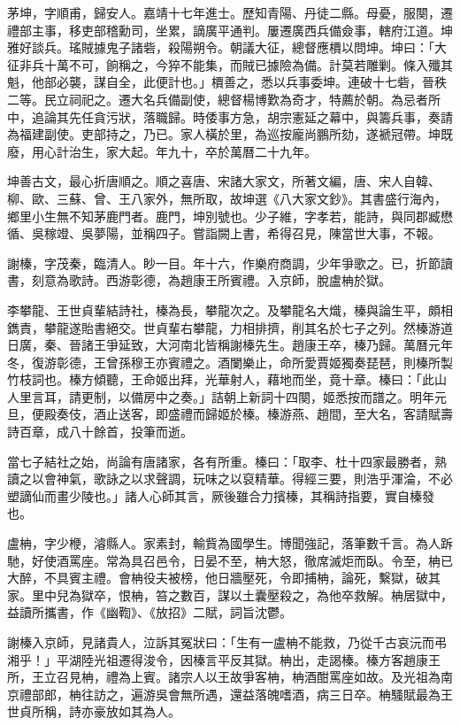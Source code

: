 \begin{pinyinscope}
茅坤，字順甫，歸安人。嘉靖十七年進士。歷知青陽、丹徒二縣。母憂，服闋，遷禮部主事，移吏部稽勳司，坐累，謫廣平通判。屢遷廣西兵備僉事，轄府江道。坤雅好談兵。瑤賊據鬼子諸砦，殺陽朔令。朝議大征，總督應檟以問坤。坤曰：「大征非兵十萬不可，餉稱之，今猝不能集，而賊已據險為備。計莫若雕剿。條入殲其魁，他部必襲，謀自全，此便計也。」檟善之，悉以兵事委坤。連破十七砦，晉秩二等。民立祠祀之。遷大名兵備副使，總督楊博歎為奇才，特薦於朝。為忌者所中，追論其先任貪污狀，落職歸。時倭事方急，胡宗憲延之幕中，與籌兵事，奏請為福建副使。吏部持之，乃已。家人橫於里，為巡按龐尚鵬所劾，遂褫冠帶。坤既廢，用心計治生，家大起。年九十，卒於萬曆二十九年。

坤善古文，最心折唐順之。順之喜唐、宋諸大家文，所著文編，唐、宋人自韓、柳、歐、三蘇、曾、王八家外，無所取，故坤選《八大家文鈔》。其書盛行海內，鄉里小生無不知茅鹿門者。鹿門，坤別號也。少子維，字孝若，能詩，與同郡臧懋循、吳稼竳、吳夢陽，並稱四子。嘗詣闕上書，希得召見，陳當世大事，不報。

謝榛，字茂秦，臨清人。眇一目。年十六，作樂府商調，少年爭歌之。已，折節讀書，刻意為歌詩。西游彰德，為趙康王所賓禮。入京師，脫盧柟於獄。

李攀龍、王世貞輩結詩社，榛為長，攀龍次之。及攀龍名大熾，榛與論生平，頗相鐫責，攀龍遂貽書絕交。世貞輩右攀龍，力相排擠，削其名於七子之列。然榛游道日廣，秦、晉諸王爭延致，大河南北皆稱謝榛先生。趙康王卒，榛乃歸。萬曆元年冬，復游彰德，王曾孫穆王亦賓禮之。酒闌樂止，命所愛賈姬獨奏琵琶，則榛所製竹枝詞也。榛方傾聽，王命姬出拜，光華射人，藉地而坐，竟十章。榛曰：「此山人里言耳，請更制，以備房中之奏。」詰朝上新詞十四闋，姬悉按而譜之。明年元旦，便殿奏伎，酒止送客，即盛禮而歸姬於榛。榛游燕、趙間，至大名，客請賦壽詩百章，成八十餘首，投筆而逝。

當七子結社之始，尚論有唐諸家，各有所重。榛曰：「取李、杜十四家最勝者，熟讀之以會神氣，歌詠之以求聲調，玩味之以裒精華。得經三要，則浩乎渾淪，不必塑謫仙而畫少陵也。」諸人心師其言，厥後雖合力擯榛，其稱詩指要，實自榛發也。

盧柟，字少楩，濬縣人。家素封，輸貲為國學生。博聞強記，落筆數千言。為人跅馳，好使酒罵座。常為具召邑令，日晏不至，柟大怒，徹席滅炬而臥。令至，柟已大醉，不具賓主禮。會柟役夫被榜，他日牆壓死，令即捕柟，論死，繫獄，破其家。里中兒為獄卒，恨柟，笞之數百，謀以土囊壓殺之，為他卒救解。柟居獄中，益讀所攜書，作《幽鞫》、《放招》二賦，詞旨沈鬱。

謝榛入京師，見諸貴人，泣訴其冤狀曰：「生有一盧柟不能救，乃從千古哀沅而弔湘乎！」平湖陸光祖遷得浚令，因榛言平反其獄。柟出，走謁榛。榛方客趙康王所，王立召見柟，禮為上賓。諸宗人以王故爭客柟，柟酒酣罵座如故。及光祖為南京禮部郎，柟往訪之，遍游吳會無所遇，還益落魄嗜酒，病三日卒。柟騷賦最為王世貞所稱，詩亦豪放如其為人。


\end{pinyinscope}
